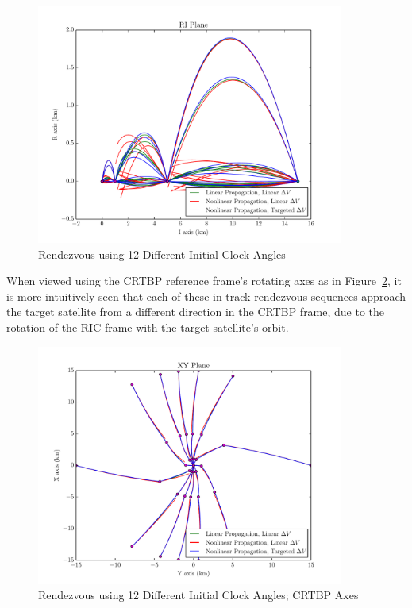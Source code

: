 \documentclass[letterpaper, preprint, paper,11pt]{AAS}	%
\begin{document}
\begin{figure}[htb] 
	\begin{center}
		\includegraphics[width=0.9\textwidth]{RIC_2}
		\caption{Rendezvous using 12 Different Initial Clock Angles}
		\label{fig:RIC_2}
	\end{center}
\end{figure}

When viewed using the CRTBP reference frame's rotating axes as in Figure~\ref{fig:RLP_2}, it is more intuitively seen that each of these in-track rendezvous sequences approach the target satellite from a different direction in the CRTBP frame, due to the rotation of the RIC frame with the target satellite's orbit.

\clearpage

\begin{figure}[htb] 
	\begin{center}
		\includegraphics[width=0.9\textwidth]{RLP_2} %
		\caption{Rendezvous using 12 Different Initial Clock Angles; CRTBP Axes}
		\label{fig:RLP_2}
	\end{center}
\end{figure}
\end{document}
